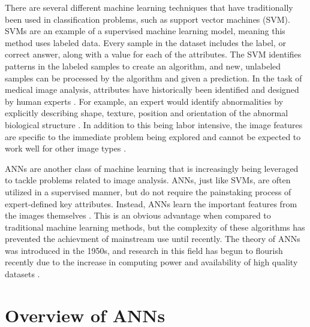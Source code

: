 \documentclass[sigconf]{acmart}
\begin{document}
There are several different machine learning techniques that have traditionally been used in classification problems, such as support vector machines (SVM). SVMs are an example of a supervised machine learning model, meaning this method uses labeled data. Every sample in the dataset includes the label, or correct answer, along with a value for each of the attributes. The SVM identifies patterns in the labeled samples to create an algorithm, and new, unlabeled samples can be processed by the algorithm and given a prediction. In the task of medical image analysis, attributes have historically been identified and designed by human experts \cite{cite06}. For example, an expert would identify abnormalities by explicitly describing shape, texture, position and orientation of the abnormal biological structure \cite{cite07}.  In addition to this being labor intensive, the image features are specific to the immediate problem being explored and cannot be expected to work well for other image types \cite{cite06}.

ANNs are another class of machine learning that is increasingly being leveraged to tackle problems related to image analysis. ANNs, just like SVMs, are often utilized in a supervised manner, but do not require the painstaking process of expert-defined key attributes. Instead, ANNs learn the important features from the images themselves \cite{cite07}. This is an obvious advantage when compared to traditional machine learning methods, but the complexity of these algorithms has prevented the achievment of mainstream use until recently. The theory of ANNs was introduced in the 1950s, and research in this field has begun to flourish recently due to the increase in computing power and availability of high quality datasets \cite{cite05}.

\section{Overview of ANNs}
\end{document}

